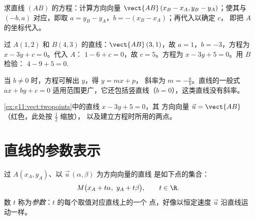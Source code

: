 \begin{method}[过两点的直线]\label{met:g11:vect:twopoints}
求直线 $(AB)$ 的方程：计算方向向量
$\vect{AB}\,(x_B - x_A, y_B - y_A)$；使其与 $(-b, a)$ 对应，即取
$a = y_B - y_A$，$b = -(x_B - x_A)$；再代入以确定 $c$，
即把 $A$ 的坐标代入。
\end{method}

\begin{example}\label{ex:g11:vect:twopoints}
过 $A(1, 2)$ 和 $B(4, 3)$ 的直线：$\vect{AB}\,(3, 1)$，故
$a = 1$，$b = -3$，方程为 $x - 3y + c = 0$。代入 $A$：
$1 - 6 + c = 0$，故 $c = 5$。方程为 $x - 3y + 5 = 0$。用 $B$ 检验：
$4 - 9 + 5 = 0$.
\end{example}

\begin{remark}
当 $b \neq 0$ 时，方程可解出 $y$，得 $y = mx + p$，
斜率为 $m = -\frac ab$。直线的一般式 $ax + by + c = 0$
适用范围更广，它还包括竖直线（$b = 0$），这类直线没有斜率。
\end{remark}

\begin{omfigure}

{\small \cref{ex:g11:vect:twopoints}中的直线 $x - 3y + 5 = 0$，其
方向向量 $\vec u = \vect{AB}$（红色，此处按 $\frac12$ 缩放），
以及建立方程时所用的两点。}
\end{omfigure}

\section{直线的参数表示}

\begin{definition}[直线的参数表示]\label{def:g11:vect:parametric}
过 $A(x_A, y_A)$、以 $\vec u\,(\alpha, \beta)$ 为方向向量的直线
是如下点的集合：
\[
M\bigl(x_A + t\alpha,\ y_A + t\beta\bigr), \qquad t \in \R .
\]
数 $t$ 称为\emph{参数}：$t$ 的每个取值对应直线上的一个
点，好像以恒定速度 $\vec u$ 沿直线运动一样。
\end{definition}

